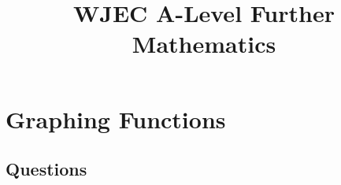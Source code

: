 \documentclass[answers]{exam}
\title{WJEC A-Level Further Mathematics}
\begin{document}
\section{Graphing Functions}

\subsection{Questions}

\end{document}
